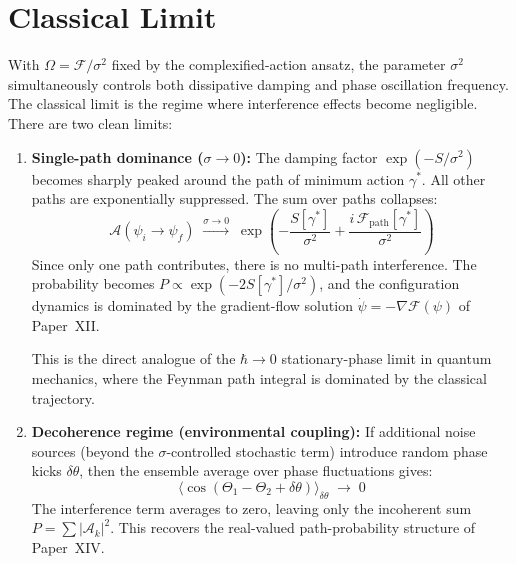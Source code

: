 \documentclass[12pt]{article}
\newcommand{\Fcal}{\mathcal{F}}
\begin{document}
\section{Classical Limit}\label{sec:classical}

With $\Omega = \Fcal/\sigma^2$ fixed by the complexified-action ansatz, the parameter $\sigma^2$ simultaneously controls both dissipative damping and phase oscillation frequency. The classical limit is the regime where interference effects become negligible. There are two clean limits:

\begin{enumerate}
    \item \textbf{Single-path dominance ($\sigma \to 0$):} The damping factor $\exp(-S/\sigma^2)$ becomes sharply peaked around the path of minimum action $\gamma^*$. All other paths are exponentially suppressed. The sum over paths collapses:
    \begin{equation}
        \mathcal{A}(\psi_i \to \psi_f) \;\xrightarrow{\sigma \to 0}\; \exp\!\left(-\frac{S[\gamma^*]}{\sigma^2} + \frac{i\, \Fcal_{\mathrm{path}}[\gamma^*]}{\sigma^2}\right)
    \end{equation}
    Since only one path contributes, there is no multi-path interference. The probability becomes $P \propto \exp(-2S[\gamma^*]/\sigma^2)$, and the configuration dynamics is dominated by the gradient-flow solution $\dot{\psi} = -\nabla\Fcal(\psi)$ of Paper~XII.

    This is the direct analogue of the $\hbar \to 0$ stationary-phase limit in quantum mechanics, where the Feynman path integral is dominated by the classical trajectory.

    \item \textbf{Decoherence regime (environmental coupling):} If additional noise sources (beyond the $\sigma$-controlled stochastic term) introduce random phase kicks $\delta\theta$, then the ensemble average over phase fluctuations gives:
    \begin{equation}
        \langle \cos(\Theta_1 - \Theta_2 + \delta\theta) \rangle_{\delta\theta} \;\to\; 0
    \end{equation}
    The interference term averages to zero, leaving only the incoherent sum $P = \sum |\mathcal{A}_k|^2$. This recovers the real-valued path-probability structure of Paper~XIV.
\end{enumerate}
\end{document}
